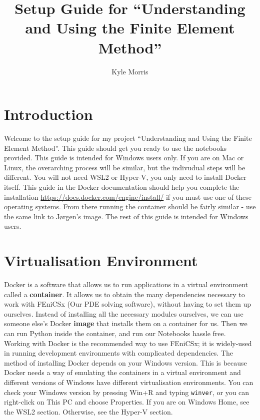 \documentclass[11pt]{article}
\title{Setup Guide for ``Understanding and Using the Finite Element Method''}
\author{Kyle Morris}
\def\code#1{\texttt{#1}}
\begin{document}
\maketitle

\pagebreak

\section{Introduction}
Welcome to the setup guide for my project ``Understanding and Using the Finite Element Method''. This guide should get you ready to use the notebooks provided. This guide is intended for Windows users only. If you are on Mac or Linux, the overarching process will be similar, but the indivudual steps will be different. You will not need WSL2 or Hyper-V, you only need to install Docker itself. This guide in the Docker documentation should help you complete the installation \url{https://docs.docker.com/engine/install/} if you must use one of these operating systems. From there running the container should be fairly similar - use the same link to Jørgen's image. The rest of this guide is intended for Windows users.

\section{Virtualisation Environment}
\label{virtualisation}
Docker is a software that allows us to run applications in a virtual environment called a \textbf{container}. It allows us to obtain the many dependencies necessary to work with FEniCSx (Our PDE solving software), without having to set them up ourselves. Instead of installing all the necessary modules ourselves, we can use someone else's Docker \textbf{image} that installs them on a container for us. Then we can run Python inside the container, and run our Notebooks hassle free. \\
Working with Docker is the recommended way to use FEniCSx; it is widely-used in running development environments with complicated dependencies.  The method of installing Docker depends on your Windows version. This is because Docker needs a way of emulating the containers in a virtual environment and different versions of Windows have different virtualisation environments. You can check your Windows version by pressing Win+R and typing \code{winver}, or you can right-click on This PC and choose Properties. If you are on Windows Home, see the WSL2 section. Otherwise, see the Hyper-V section.

\pagebreak
\end{document}
